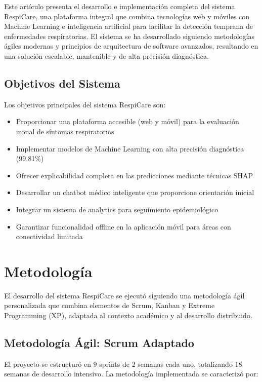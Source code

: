 \documentclass[12pt,a4paper]{article}
\begin{document}
Este artículo presenta el desarrollo e implementación completa del sistema RespiCare, una plataforma integral que combina tecnologías web y móviles con Machine Learning e inteligencia artificial para facilitar la detección temprana de enfermedades respiratorias. El sistema se ha desarrollado siguiendo metodologías ágiles modernas y principios de arquitectura de software avanzados, resultando en una solución escalable, mantenible y de alta precisión diagnóstica.

\subsection{Objetivos del Sistema}

Los objetivos principales del sistema RespiCare son:

\begin{itemize}
    \item Proporcionar una plataforma accesible (web y móvil) para la evaluación inicial de síntomas respiratorios
    \item Implementar modelos de Machine Learning con alta precisión diagnóstica (99.81\%)
    \item Ofrecer explicabilidad completa en las predicciones mediante técnicas SHAP
    \item Desarrollar un chatbot médico inteligente que proporcione orientación inicial
    \item Integrar un sistema de analytics para seguimiento epidemiológico
    \item Garantizar funcionalidad offline en la aplicación móvil para áreas con conectividad limitada
\end{itemize}

\section{Metodología}

El desarrollo del sistema RespiCare se ejecutó siguiendo una metodología ágil personalizada que combina elementos de Scrum, Kanban y Extreme Programming (XP), adaptada al contexto académico y al desarrollo distribuido.

\subsection{Metodología Ágil: Scrum Adaptado}

El proyecto se estructuró en 9 sprints de 2 semanas cada uno, totalizando 18 semanas de desarrollo intensivo. La metodología implementada se caracterizó por:
\end{document}
